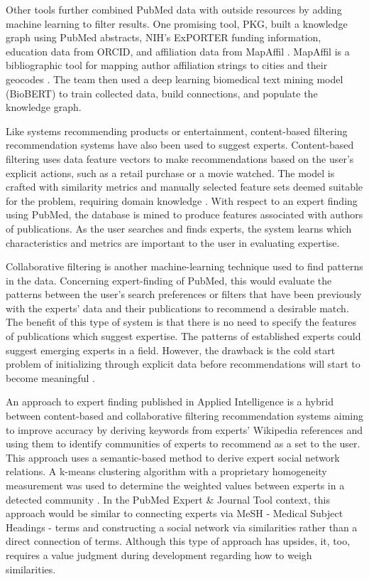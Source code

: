 Other tools further combined PubMed data with outside resources by adding machine learning to filter results. One promising tool, PKG, built a knowledge graph using PubMed abstracts, NIH's ExPORTER funding information, education data from ORCID, and affiliation data from MapAffil \cite{ref-pubmed-knowledge-graph}. MapAffil is a bibliographic tool for mapping author affiliation strings to cities and their geocodes \cite{ref-pubmed-mapaffil}. The team then used a deep learning biomedical text mining model (BioBERT) to train collected data, build connections, and populate the knowledge graph. 

Like systems recommending products or entertainment, content-based filtering recommendation systems have also been used to suggest experts. Content-based filtering uses data feature vectors to make recommendations based on the user's explicit actions, such as a retail purchase or a movie watched. The model is crafted with similarity metrics and manually selected feature sets deemed suitable for the problem, requiring domain knowledge \cite{ref-google-content-filtering}. With respect to an expert finding using PubMed, the database is mined to produce features associated with authors of publications. As the user searches and finds experts, the system learns which characteristics and metrics are important to the user in evaluating expertise. 

Collaborative filtering is another machine-learning technique used to find patterns in the data. Concerning expert-finding of PubMed, this would evaluate the patterns between the user's search preferences or filters that have been previously with the experts' data and their publications to recommend a desirable match. The benefit of this type of system is that there is no need to specify the features of publications which suggest expertise. The patterns of established experts could suggest emerging experts in a field. However, the drawback is the cold start problem of initializing through explicit data before recommendations will start to become meaningful \cite{ref-google-collaborative-filtering}.

An approach to expert finding published in Applied Intelligence is a hybrid between content-based and collaborative filtering recommendation systems aiming to improve accuracy by deriving keywords from experts' Wikipedia references and using them to identify communities of experts to recommend as a set to the user. This approach uses a semantic-based method to derive expert social network relations. A k-means clustering algorithm with a proprietary homogeneity measurement was used to determine the weighted values between experts in a detected community \cite{ref-semantic-social-network}. In the PubMed Expert \& Journal Tool context, this approach would be similar to connecting experts via MeSH - Medical Subject Headings - terms and constructing a social network via similarities rather than a direct connection of terms. Although this type of approach has upsides, it, too, requires a value judgment during development regarding how to weigh similarities. 

